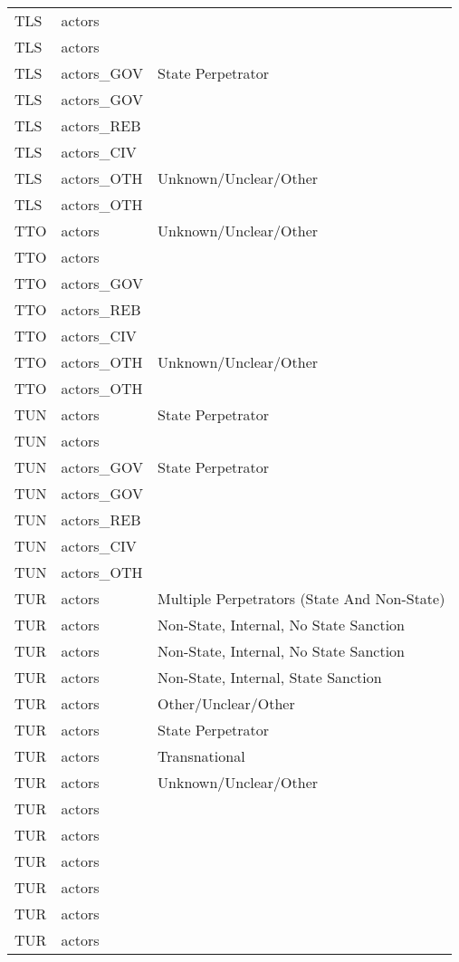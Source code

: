 \begin{table}[ht]
\begin{tabular}{lll}
  TLS & actors &  \\ 
  TLS & actors &  \\ 
  TLS & actors\_GOV & State Perpetrator \\ 
  TLS & actors\_GOV &  \\ 
  TLS & actors\_REB &  \\ 
  TLS & actors\_CIV &  \\ 
  TLS & actors\_OTH & Unknown/Unclear/Other \\ 
  TLS & actors\_OTH &  \\ 
  TTO & actors & Unknown/Unclear/Other \\ 
  TTO & actors &  \\ 
  TTO & actors\_GOV &  \\ 
  TTO & actors\_REB &  \\ 
  TTO & actors\_CIV &  \\ 
  TTO & actors\_OTH & Unknown/Unclear/Other \\ 
  TTO & actors\_OTH &  \\ 
  TUN & actors & State Perpetrator \\ 
  TUN & actors &  \\ 
  TUN & actors\_GOV & State Perpetrator \\ 
  TUN & actors\_GOV &  \\ 
  TUN & actors\_REB &  \\ 
  TUN & actors\_CIV &  \\ 
  TUN & actors\_OTH &  \\ 
  TUR & actors & Multiple Perpetrators (State And Non-State) \\ 
  TUR & actors & Non-State, Internal, No State Sanction \\ 
  TUR & actors & Non-State, Internal, No State Sanction \\ 
  TUR & actors & Non-State, Internal, State Sanction \\ 
  TUR & actors & Other/Unclear/Other \\ 
  TUR & actors & State Perpetrator \\ 
  TUR & actors & Transnational \\ 
  TUR & actors & Unknown/Unclear/Other \\ 
  TUR & actors &  \\ 
  TUR & actors &  \\ 
  TUR & actors &  \\ 
  TUR & actors &  \\ 
  TUR & actors &  \\ 
  TUR & actors &  \\ 

\end{tabular}
\end{table}
